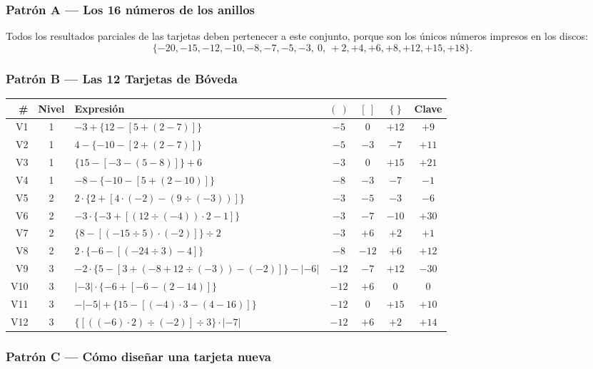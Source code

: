 \documentclass[12pt, letterpaper]{article}
\newcommand{\abs}[1]{\lvert #1\rvert}
\begin{document}
\subsubsection{Patrón A — Los 16 números de los anillos}

Todos los resultados parciales de las tarjetas deben pertenecer a este conjunto, porque son los únicos números impresos en los discos:
\[
\{-20,-15,-12,-10,-8,-7,-5,-3,\ 0,\ +2,+4,+6,+8,+12,+15,+18\}.
\]

\subsubsection{Patrón B — Las 12 Tarjetas de Bóveda}

{\footnotesize
\begin{longtable}{@{}r c >{\raggedright\arraybackslash}p{6.1cm} c c c c@{}}
\toprule
\textbf{\#} & \textbf{Nivel} & \textbf{Expresión} & $\boldsymbol{(~)}$ & $\boldsymbol{[~]}$ & $\boldsymbol{\{~\}}$ & \textbf{Clave}\\
\midrule
\endhead
\bottomrule
\endfoot
V1 & 1 & $-3+\{12-[5+(2-7)]\}$ & $-5$ & $0$ & $+12$ & $+9$\\
V2 & 1 & $4-\{-10-[2+(2-7)]\}$ & $-5$ & $-3$ & $-7$ & $+11$\\
V3 & 1 & $\{15-[-3-(5-8)]\}+6$ & $-3$ & $0$ & $+15$ & $+21$\\
V4 & 1 & $-8-\{-10-[5+(2-10)]\}$ & $-8$ & $-3$ & $-7$ & $-1$\\
V5 & 2 & $2\cdot\{2+[4\cdot(-2)-(9\div(-3))]\}$ & $-3$ & $-5$ & $-3$ & $-6$\\
V6 & 2 & $-3\cdot\{-3+[(12\div(-4))\cdot 2-1]\}$ & $-3$ & $-7$ & $-10$ & $+30$\\
V7 & 2 & $\{8-[(-15\div 5)\cdot(-2)]\}\div 2$ & $-3$ & $+6$ & $+2$ & $+1$\\
V8 & 2 & $2\cdot\{-6-[(-24\div 3)-4]\}$ & $-8$ & $-12$ & $+6$ & $+12$\\
V9 & 3 & $-2\cdot\{5-[3+(-8+12\div(-3))-(-2)]\}-\abs{-6}$ & $-12$ & $-7$ & $+12$ & $-30$\\
V10 & 3 & $\abs{-3}\cdot\{-6+[-6-(2-14)]\}$ & $-12$ & $+6$ & $0$ & $0$\\
V11 & 3 & $-\abs{-5}+\{15-[(-4)\cdot 3-(4-16)]\}$ & $-12$ & $0$ & $+15$ & $+10$\\
V12 & 3 & $\{[((-6)\cdot 2)\div(-2)]\div 3\}\cdot\abs{-7}$ & $-12$ & $+6$ & $+2$ & $+14$\\
\end{longtable}
}

\subsubsection{Patrón C — Cómo diseñar una tarjeta nueva}
\end{document}
